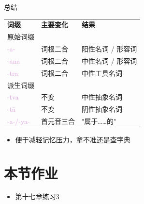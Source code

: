 \documentclass[17pt]{beamer}
\newcommand{\pratyaya}[1]{\mbox{\textcolor{Plum}{#1}}}
\begin{document}
\begin{frame}{总结}
  \centering
  \small
  \begin{NiceTabular}{lll}
    \textbf{词缀} & \textbf{主要变化} & \textbf{结果} \\
    原始词缀 & & \\
    \pratyaya{-a-} & 词根二合 & 阳性名词 / 形容词 \\
    \pratyaya{-ana} & 词根二合 & 中性名词 / 形容词 \\
    \pratyaya{-tra} & 词根二合 & 中性工具名词 \\
    派生词缀 & & \\
    \pratyaya{-tva} & 不变 & 中性抽象名词 \\
    \pratyaya{-tā} & 不变 & 阴性抽象名词 \\
    \pratyaya{-a-/-ya-} & 首元音三合 & "属于……的" \\
  \end{NiceTabular}
  \begin{itemize}
    \item 便于减轻记忆压力，拿不准还是查字典 
  \end{itemize}
\end{frame}

\section{本节作业}

\begin{frame}{\insertsection}
  \begin{itemize}
    \item 第十七章练习3
  \end{itemize}
\end{frame}
\end{document}
